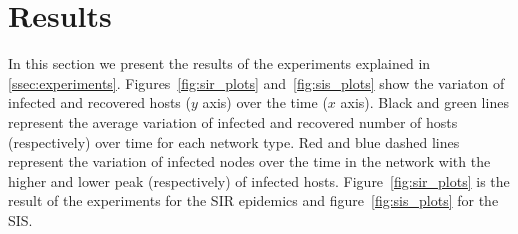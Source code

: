 \section{Results}

In this section we present the results of the experiments explained in \ref{ssec:experiments}. Figures~\ref{fig:sir_plots} and~\ref{fig:sis_plots} show the variaton of infected and recovered hosts ($y$ axis) over the time ($x$ axis). Black and green lines represent the average variation of infected and recovered number of hosts (respectively) over time for each network type. Red and blue dashed lines represent the variation of infected nodes over the time in the network with the higher and lower peak (respectively) of infected hosts. Figure~\ref{fig:sir_plots} is the result of the experiments for the SIR epidemics and figure~\ref{fig:sis_plots} for the SIS.

